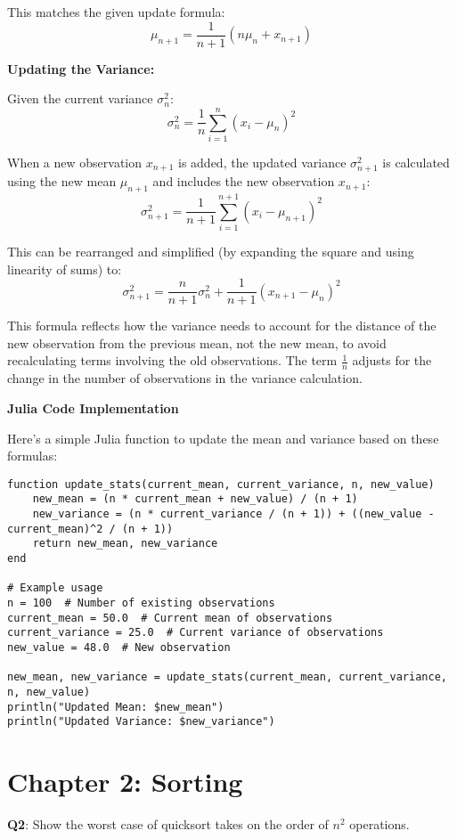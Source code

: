 \documentclass{article}
\begin{document}
This matches the given update formula:
\[ \mu_{n+1} = \frac{1}{n+1} (n\mu_n + x_{n+1}) \]

\textbf{Updating the Variance:}

Given the current variance \(\sigma_n^2\):
\[ \sigma_n^2 = \frac{1}{n} \sum_{i=1}^n (x_i - \mu_n)^2 \]

When a new observation \(x_{n+1}\) is added, the updated variance \(\sigma_{n+1}^2\) is calculated using the new mean \(\mu_{n+1}\) and includes the new observation \(x_{n+1}\):
\[ \sigma_{n+1}^2 = \frac{1}{n+1} \sum_{i=1}^{n+1} (x_i - \mu_{n+1})^2 \]

This can be rearranged and simplified (by expanding the square and using linearity of sums) to:
\[ \sigma_{n+1}^2 = \frac{n}{n+1} \sigma_n^2 + \frac{1}{n+1} (x_{n+1} - \mu_n)^2 \]

This formula reflects how the variance needs to account for the distance of the new observation from the previous mean, not the new mean, to avoid recalculating terms involving the old observations. The term \(\frac{1}{n}\) adjusts for the change in the number of observations in the variance calculation.

\textbf{Julia Code Implementation}

Here's a simple Julia function to update the mean and variance based on these formulas:

\begin{verbatim}
function update_stats(current_mean, current_variance, n, new_value)
    new_mean = (n * current_mean + new_value) / (n + 1)
    new_variance = (n * current_variance / (n + 1)) + ((new_value - current_mean)^2 / (n + 1))
    return new_mean, new_variance
end

# Example usage
n = 100  # Number of existing observations
current_mean = 50.0  # Current mean of observations
current_variance = 25.0  # Current variance of observations
new_value = 48.0  # New observation

new_mean, new_variance = update_stats(current_mean, current_variance, n, new_value)
println("Updated Mean: $new_mean")
println("Updated Variance: $new_variance")
\end{verbatim}

\newpage
\section*{Chapter 2: Sorting}

\textbf{Q2}: Show the worst case of quicksort takes on the order of \(n^2\) operations.
\end{document}
